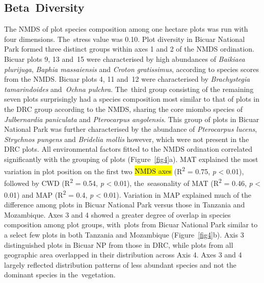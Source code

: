 \documentclass[diversity,article,accept,moreauthors,pdftex]{Definitions/mdpi}
\newcommand{\nmdsstress}{0.10}
\newcommand{\nmdsmat}{{R}\textsuperscript{2} = 0.75, \emph{p} < 0.01}
\newcommand{\nmdsmap}{{R}\textsuperscript{2} = 0.4, \emph{p} < 0.01}
\newcommand{\nmdsmatsd}{{R}\textsuperscript{2} = 0.46, \emph{p} < 0.01}
\newcommand{\nmdsmapsd}{{R}\textsuperscript{2} = 0.54, \emph{p} < 0.01}
\begin{document}
\subsection{Beta~Diversity}

The NMDS of plot species composition among one hectare plots was run with four dimensions. The~stress value was \nmdsstress{}. Plot diversity in Bicuar National Park formed three distinct groups within axes 1 and 2 of the NMDS ordination. Bicuar plots 9, 13 and~15 were characterised by high abundances of \textit{Baikiaea plurijuga}, \textit{Baphia massaiensis} and \textit{Croton gratissimus}, according to species scores from the NMDS. Bicuar plots 4, 11 and~12 were characterised  by \textit{Brachystegia tamarindoides} and~\textit{Ochna pulchra}. The~third group consisting of the remaining seven plots surprisingly had a species composition most similar to that of plots in the DRC group according to the NMDS, sharing the core miombo species of \textit{Julbernardia paniculata} and \textit{Pterocarpus angolensis}. This group of plots in Bicuar National Park was further characterised by the abundance of \textit{Pterocarpus lucens}, \textit{Strychnos pungens} and \textit{Bridelia mollis} however, which were not present in the DRC plots. All environmental factors fitted to the NMDS ordination correlated significantly with the grouping of plots (Figure~\ref{fig4}a). MAT explained the most variation in plot position on the first two \hl{NMDS axes} %
(\nmdsmat{}), followed by CWD (\nmdsmapsd{}), the~seasonality of MAT (\nmdsmatsd{}) and MAP (\nmdsmap{}). Variation in MAP explained much of the difference among plots in Bicuar National Park versus those in Tanzania and Mozambique. Axes 3 and 4 showed a greater degree of overlap in species composition among plot groups, with~plots from Bicuar National Park similar to a select few plots in both Tanzania and Mozambique (Figure~\ref{fig4}b). Axis 3 distinguished plots in Bicuar NP from those in DRC, while plots from all geographic area overlapped in their distribution across Axis 4. Axes 3 and 4 largely reflected distribution patterns of less abundant species and not the dominant species in the~vegetation.
\end{document}
